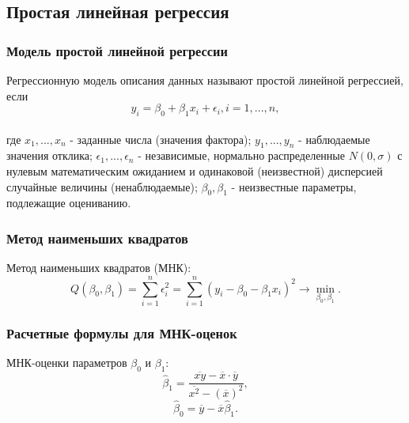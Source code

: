 \subsection {Простая линейная регрессия}
	\subsubsection {Модель простой линейной регрессии}
		Регрессионную модель описания данных называют простой линейной регрессией, если\\
		\begin{equation} y_i = \beta_0 + \beta_1 x_i + \epsilon_i, i = 1, ..., n, \end{equation}\\
		где $x_1, ..., x_n$ - заданные числа (значения фактора); $y_1, ..., y_n$ - наблюдаемые значения отклика; $\epsilon_1, ..., \epsilon_n$ - независимые, нормально распределенные $N(0, \sigma)$ с нулевым математическим ожиданием и одинаковой (неизвестной) дисперсией случайные величины (ненаблюдаемые); $\beta_0, \beta_1$ - неизвестные параметры, подлежащие оцениванию.

	\subsubsection {Метод наименьших квадратов}
		Метод наименьших квадратов (МНК):\\
		\begin{equation}
			Q(\beta_0, \beta_1) = \sum_{i=1}^n\epsilon_i^2 = \sum_{i=1}^n(y_i - \beta_0 - \beta_1x_i)^2 \rightarrow \min_{\beta_0, \beta_1}.
		\end{equation}

	\subsubsection {Расчетные формулы для МНК-оценок}
		МНК-оценки параметров $\beta_0$ и $\beta_1$:\\
		\begin{equation} \hat\beta_1 = \frac{\overline{xy} - \overline x \cdot \overline y}{\overline{x^2} - (\overline x)^2}, \end{equation}
		\begin{equation} \hat\beta_0 = \overline y - \overline x \hat\beta_1. \end{equation}


